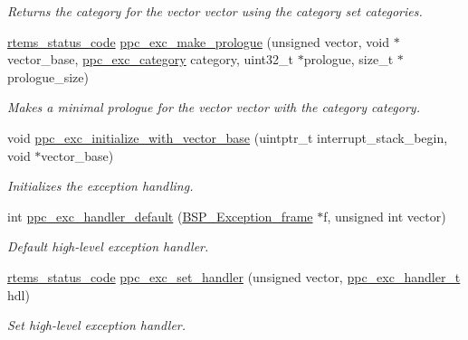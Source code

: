 \begin{DoxyCompactItemize}
\begin{DoxyCompactList}\small\item\em Returns the category for the vector {\itshape vector} using the category set {\itshape categories}. \end{DoxyCompactList}\item 
\mbox{\hyperlink{group__ClassicStatus_ga545d41846817eaba6143d52ee4d9e9fe}{rtems\+\_\+status\+\_\+code}} \mbox{\hyperlink{group__ppc__exc_gac2b2347bcb0a4b1e24af8eebf12197f3}{ppc\+\_\+exc\+\_\+make\+\_\+prologue}} (unsigned vector, void $\ast$vector\+\_\+base, \mbox{\hyperlink{group__ppc__exc_gab5c9ba70d9560d278d06983d7ea3babe}{ppc\+\_\+exc\+\_\+category}} category, uint32\+\_\+t $\ast$prologue, size\+\_\+t $\ast$prologue\+\_\+size)
\begin{DoxyCompactList}\small\item\em Makes a minimal prologue for the vector {\itshape vector} with the category {\itshape category}. \end{DoxyCompactList}\item 
void \mbox{\hyperlink{group__ppc__exc_ga29db27edaf745d8e0101ba4c4d8fddd2}{ppc\+\_\+exc\+\_\+initialize\+\_\+with\+\_\+vector\+\_\+base}} (uintptr\+\_\+t interrupt\+\_\+stack\+\_\+begin, void $\ast$vector\+\_\+base)
\begin{DoxyCompactList}\small\item\em Initializes the exception handling. \end{DoxyCompactList}\item 
int \mbox{\hyperlink{group__ppc__exc_ga61ffc165cc3523a30f39b5815814081b}{ppc\+\_\+exc\+\_\+handler\+\_\+default}} (\mbox{\hyperlink{structCPU__Exception__frame}{B\+S\+P\+\_\+\+Exception\+\_\+frame}} $\ast$f, unsigned int vector)
\begin{DoxyCompactList}\small\item\em Default high-\/level exception handler. \end{DoxyCompactList}\item 
\mbox{\hyperlink{group__ClassicStatus_ga545d41846817eaba6143d52ee4d9e9fe}{rtems\+\_\+status\+\_\+code}} \mbox{\hyperlink{group__ppc__exc_gaa2c5ca507568e64cb4c94ccc98e9f635}{ppc\+\_\+exc\+\_\+set\+\_\+handler}} (unsigned vector, \mbox{\hyperlink{group__ppc__exc_ga310d4349fafb7f5d8d5e89d6c6f39ab9}{ppc\+\_\+exc\+\_\+handler\+\_\+t}} hdl)
\begin{DoxyCompactList}\small\item\em Set high-\/level exception handler. \end{DoxyCompactList}\item 

\end{DoxyCompactItemize}
